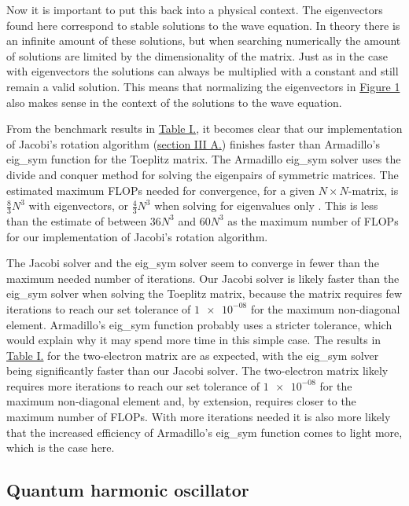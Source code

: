 \documentclass[reprint,english,notitlepage]{revtex4-1}  %
\begin{document}
Now it is important to put this back into a physical context. The eigenvectors found here correspond to stable solutions to the wave equation. In theory there is an infinite amount of these solutions, but when searching numerically the amount of solutions are limited by the dimensionality of the matrix. Just as in the case with eigenvectors the solutions can always be multiplied with a constant and still remain a valid solution. This means that normalizing the eigenvectors in \hyperref[fig:IV:a:1]{Figure 1} also makes sense in the context of the solutions to the wave equation.

From the benchmark results in \hyperref[table:IV:a:1]{Table I.}, it becomes clear that our implementation of Jacobi's rotation algorithm (\hyperref[sec:III:a]{section III A.}) finishes faster than Armadillo's eig\_sym function for the Toeplitz matrix. The Armadillo eig\_sym solver uses the divide and conquer method \citep{Armadillo} for solving the eigenpairs of symmetric matrices. The estimated maximum FLOPs needed for convergence, for a given \(N\times N\)-matrix, is \(\frac{8}{3}N^{3}\) with eigenvectors, or \(\frac{4}{3}N^{3}\) when solving for eigenvalues only \citep{Cuppen}. This is less than the estimate of between \(36N^{3}\) and \(60N^{3}\) as the maximum number of FLOPs for our implementation of Jacobi's rotation algorithm.

The Jacobi solver and the eig\_sym solver seem to converge in fewer than the maximum needed number of iterations. Our Jacobi solver is likely faster than the eig\_sym solver when solving the Toeplitz matrix, because the matrix requires few iterations to reach our set tolerance of \(\num{1e-08}\) for the maximum non-diagonal element. Armadillo's eig\_sym function probably uses a stricter tolerance, which would explain why it may spend more time in this simple case. The results in \hyperref[table:IV:a:1]{Table I.} for the two-electron matrix are as expected, with the eig\_sym solver being significantly faster than our Jacobi solver. The two-electron matrix likely requires more iterations to reach our set tolerance of \(\num{1e-08}\) for the maximum non-diagonal element and, by extension, requires closer to the maximum number of FLOPs. With more iterations needed it is also more likely that the increased efficiency of Armadillo's eig\_sym function comes to light more, which is the case here. 


\subsection{Quantum harmonic oscillator} \label{sec:V:b}
\end{document}
